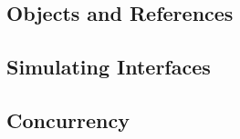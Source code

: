 \subsection{Objects and References}


%
%
%
%

\subsection{Simulating Interfaces}
\subsection{Concurrency}